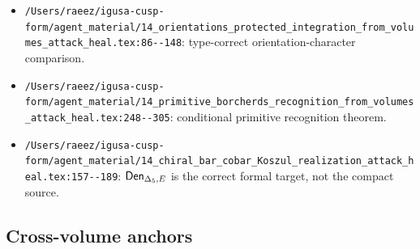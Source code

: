 \begin{itemize}
hybrid local/global wrapped factorization target shape.
\item \verb|/Users/raeez/igusa-cusp-form/agent_material/14_orientations_protected_integration_from_volumes_attack_heal.tex:86--148|:
type-correct orientation-character comparison.
\item \verb|/Users/raeez/igusa-cusp-form/agent_material/14_primitive_borcherds_recognition_from_volumes_attack_heal.tex:248--305|:
conditional primitive recognition theorem.
\item \verb|/Users/raeez/igusa-cusp-form/agent_material/14_chiral_bar_cobar_Koszul_realization_attack_heal.tex:157--189|:
\(\mathsf{Den}_{\Delta_5,E}\) is the correct formal target, not the compact source.
\end{itemize}

\subsection{Cross-volume anchors}


